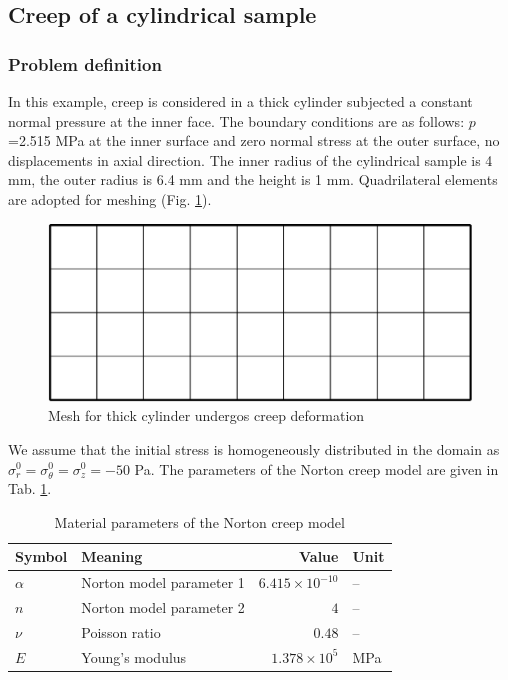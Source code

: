 \subsection{Creep of a cylindrical sample}

\subsubsection*{Problem definition}

In this example, creep is considered in a thick cylinder subjected a
constant normal pressure at the inner face.
%
The boundary conditions are as follows: $p$ =2.515 MPa at the inner
surface and zero normal stress at the outer surface, no
displacements in axial direction. The inner radius of the
cylindrical sample is 4 mm, the outer radius is 6.4 mm and the
height is 1 mm. Quadrilateral elements are adopted for meshing (Fig.
\ref{fig:meshcrp}).
%
\begin{figure}[!htb]
\centering
\includegraphics[scale=0.3]{M/mesh_crp}
\caption{Mesh for thick cylinder undergos creep deformation}
\label{fig:meshcrp}
\end{figure}

We assume that the initial stress is homogeneously distributed in
the domain as $\sigma_{r}^0=\sigma_{\theta}^0=\sigma_{z}^0=-50$ Pa.
The parameters of the Norton creep model are given in Tab.
\ref{tab:creep_norton}.

\begin{table}[H]
\center
\begin{tabular}{llrl}
\hline\noalign{\smallskip}
\hline
Symbol & Meaning & Value & Unit \\
\hline
$\alpha$ & Norton model parameter 1 & $6.415\times 10^{-10}$ & -- \\
$n$      & Norton model parameter 2 & $4$ & -- \\
$\nu$    & Poisson ratio & $0.48$ & -- \\
$E$      & Young's modulus & $1.378\times10^5$ & MPa \\
\hline\hline
\end{tabular}
\caption{Material parameters of the Norton creep model} %
\label{tab:creep_norton}
\end{table}


